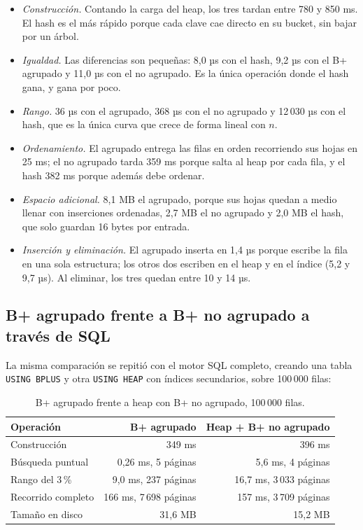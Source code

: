 \documentclass[11pt,a4paper]{article}
\begin{document}
\begin{itemize}
  \item \emph{Construcción.} Contando la carga del heap, los tres tardan entre 780 y 850 ms. El hash es el más rápido porque cada clave cae directo en su bucket, sin bajar por un árbol.
  \item \emph{Igualdad.} Las diferencias son pequeñas: 8,0 µs con el hash, 9,2 µs con el B+ agrupado y 11,0 µs con el no agrupado. Es la única operación donde el hash gana, y gana por poco.
  \item \emph{Rango.} 36 µs con el agrupado, 368 µs con el no agrupado y 12\,030 µs con el hash, que es la única curva que crece de forma lineal con $n$.
  \item \emph{Ordenamiento.} El agrupado entrega las filas en orden recorriendo sus hojas en 25 ms; el no agrupado tarda 359 ms porque salta al heap por cada fila, y el hash 382 ms porque además debe ordenar.
  \item \emph{Espacio adicional.} 8,1 MB el agrupado, porque sus hojas quedan a medio llenar con inserciones ordenadas, 2,7 MB el no agrupado y 2,0 MB el hash, que solo guardan 16 bytes por entrada.
  \item \emph{Inserción y eliminación.} El agrupado inserta en 1,4 µs porque escribe la fila en una sola estructura; los otros dos escriben en el heap y en el índice (5,2 y 9,7 µs). Al eliminar, los tres quedan entre 10 y 14 µs.
\end{itemize}

\subsection{B+ agrupado frente a B+ no agrupado a través de SQL}

La misma comparación se repitió con el motor SQL completo, creando una tabla \texttt{USING BPLUS} y otra \texttt{USING HEAP} con índices secundarios, sobre 100\,000 filas:

\begin{table}[H]
\centering
\begin{tabular}{lrr}
\toprule
Operación & B+ agrupado & Heap + B+ no agrupado \\
\midrule
Construcción & 349 ms & 396 ms \\
Búsqueda puntual & 0,26 ms, 5 páginas & 5,6 ms, 4 páginas \\
Rango del 3\,\% & 9,0 ms, 237 páginas & 16,7 ms, 3\,033 páginas \\
Recorrido completo & 166 ms, 7\,698 páginas & 157 ms, 3\,709 páginas \\
Tamaño en disco & 31,6 MB & 15,2 MB \\
\bottomrule
\end{tabular}
\caption{B+ agrupado frente a heap con B+ no agrupado, 100\,000 filas.}
\end{table}
\end{document}
